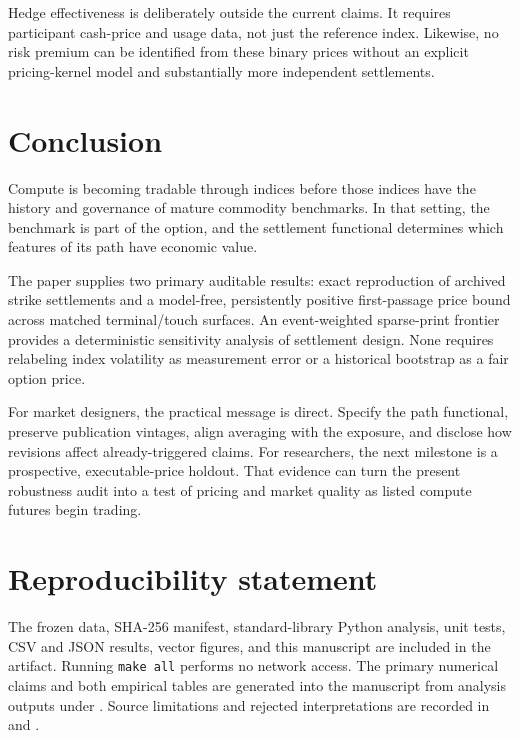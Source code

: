 \documentclass[10pt,twocolumn]{article}
\newcommand{\code}[1]{\texttt{#1}}
\begin{document}
Hedge effectiveness is deliberately outside the current claims. It requires
participant cash-price and usage data, not just the reference index. Likewise,
no risk premium can be identified from these binary prices without an explicit
pricing-kernel model and substantially more independent settlements.

\section{Conclusion}

Compute is becoming tradable through indices before those indices have the
history and governance of mature commodity benchmarks. In that setting, the
benchmark is part of the option, and the settlement functional determines which
features of its path have economic value.

The paper supplies two primary auditable results: exact reproduction of
\NContracts{} archived strike settlements and a model-free, persistently positive
first-passage price bound across matched terminal/touch surfaces. An
event-weighted sparse-print frontier provides a deterministic sensitivity
analysis of settlement design. None requires relabeling index volatility as
measurement error or a historical bootstrap as a fair option price.

For market designers, the practical message is direct. Specify the path
functional, preserve publication vintages, align averaging with the exposure,
and disclose how revisions affect already-triggered claims. For researchers,
the next milestone is a prospective, executable-price holdout. That evidence
can turn the present robustness audit into a test of pricing and market quality
as listed compute futures begin trading.

\section*{Reproducibility statement}

The frozen data, SHA-256 manifest, standard-library Python analysis, unit tests,
CSV and JSON results, vector figures, and this manuscript are included in the
artifact. Running \code{make all} performs no network access. The
primary numerical claims and both empirical tables are generated into the
manuscript from analysis outputs under . Source limitations and rejected
interpretations are recorded in  and
.
\end{document}
